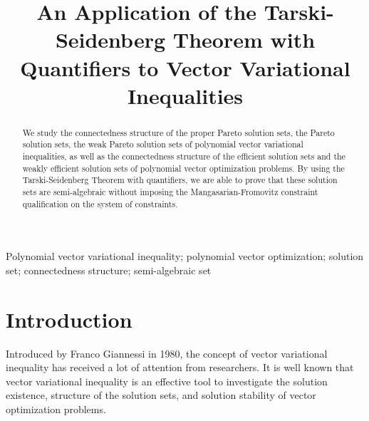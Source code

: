 \documentclass[]{interact}
\theoremstyle{plain}%
\theoremstyle{definition}
\begin{document}
	\title{An Application of the Tarski-Seidenberg Theorem with Quantifiers to Vector Variational Inequalities}

\author{
	}

\maketitle

\begin{abstract}
We study the connectedness structure of the proper Pareto solution sets, the Pareto solution sets, the weak Pareto solution sets of  polynomial  vector variational inequalities, as well as the connectedness structure of the efficient solution sets and the weakly efficient solution sets of polynomial vector optimization problems. By using the Tarski-Seidenberg Theorem with quantifiers, we are able to prove that these solution sets are semi-algebraic without imposing the Mangasarian-Fromovitz constraint qualification on the system of constraints. 
\end{abstract}

\begin{keywords}
	Polynomial vector variational inequality; polynomial vector optimization; solution set; connectedness structure; semi-algebraic set
\end{keywords}

\section{Introduction}

Introduced by Franco Giannessi \cite{G80} in 1980, the concept of vector variational inequality has received a lot of attention from researchers. It is well known that vector variational inequality is an effective tool \cite{LKLY98} to investigate the solution existence, structure of the solution sets, and solution stability of vector optimization problems.
\end{document}
